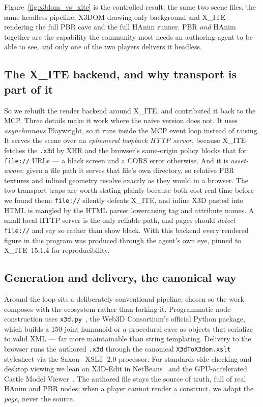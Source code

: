 \documentclass[11pt]{article}
\newcommand{\xite}{X\_ITE}
\begin{document}
Figure~\ref{fig:x3dom_vs_xite} is the controlled result: the same two scene files, the same headless pipeline, X3DOM drawing only background and \xite{}~\cite{xite} rendering the full PBR cave and the full HAnim runner. PBR \emph{and} HAnim together are the capability the community most needs an authoring agent to be able to see, and only one of the two players delivers it headless.

\subsection{The \xite{} backend, and why transport is part of it}

So we rebuilt the render backend around \xite{}, and contributed it back to the MCP. Three details make it work where the naive version does not. It uses \emph{asynchronous} Playwright, so it runs inside the MCP event loop instead of raising. It serves the scene over an \emph{ephemeral loopback HTTP server}, because \xite{} fetches the \texttt{.x3d} by XHR and the browser's same-origin policy blocks that for \texttt{file://} URLs --- a black screen and a CORS error otherwise. And it is \emph{asset-aware}: given a file path it serves that file's own directory, so relative PBR textures and inlined geometry resolve exactly as they would in a browser. The two transport traps are worth stating plainly because both cost real time before we found them: \texttt{file://} silently defeats \xite{}, and inline X3D pasted into HTML is mangled by the HTML parser lowercasing tag and attribute names. A small local HTTP server is the only reliable path, and pages should \emph{detect} \texttt{file://} and say so rather than show black. With this backend every rendered figure in this program was produced through the agent's own eye, pinned to \xite{}~15.1.4 for reproducibility.

\subsection{Generation and delivery, the canonical way}

Around the loop sits a deliberately conventional pipeline, chosen so the work composes with the ecosystem rather than forking it. Programmatic node construction uses \texttt{x3d.py}~\cite{x3dpy}, the Web3D Consortium's official Python package, which builds a 150-joint humanoid or a procedural cave as objects that serialize to valid XML --- far more maintainable than string templating. Delivery to the browser runs the authored \texttt{.x3d} through the canonical \texttt{X3dToX3dom.xslt}~\cite{x3dtox3dom} stylesheet via the Saxon~\cite{saxon} XSLT~2.0 processor. For standards-side checking and desktop viewing we lean on X3D-Edit in NetBeans~\cite{netbeans} and the GPU-accelerated Castle Model Viewer~\cite{castle}. The authored file stays the source of truth, full of real HAnim and PBR nodes; when a player cannot render a construct, we adapt the \emph{page}, never the source.
\end{document}
